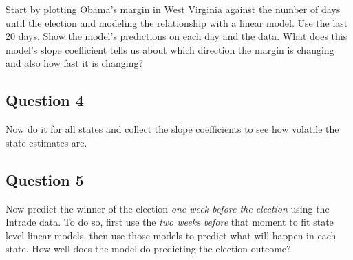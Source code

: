 \documentclass[]{article}
\begin{document}
Start by plotting Obama's margin in West Virginia against the number of
days until the election and modeling the relationship with a linear
model. Use the last 20 days. Show the model's predictions on each day
and the data. What does this model's slope coefficient tells us about
which direction the margin is changing and also how fast it is changing?

\subsection{Question 4}\label{question-4}

Now do it for all states and collect the slope coefficients to see how
volatile the state estimates are.

\subsection{Question 5}\label{question-5}

Now predict the winner of the election \emph{one week before the
election} using the Intrade data. To do so, first use the \emph{two
weeks before} that moment to fit state level linear models, then use
those models to predict what will happen in each state. How well does
the model do predicting the election outcome?
\end{document}

